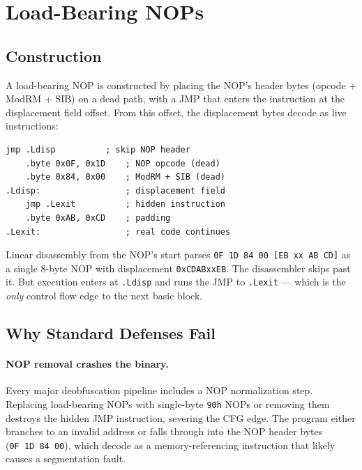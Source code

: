 \documentclass[letterpaper,twocolumn,10pt]{article}
\begin{document}
\section{Load-Bearing NOPs}
\label{sec:technique}

\subsection{Construction}

A load-bearing NOP is constructed by placing the NOP's header bytes (opcode + ModRM + SIB) on a dead path, with a JMP that enters the instruction at the displacement field offset. From this offset, the displacement bytes decode as live instructions:

\begin{lstlisting}[language={[x86masm]Assembler}]
    jmp .Ldisp          ; skip NOP header
    .byte 0x0F, 0x1D    ; NOP opcode (dead)
    .byte 0x84, 0x00    ; ModRM + SIB (dead)
.Ldisp:                 ; displacement field
    jmp .Lexit          ; hidden instruction
    .byte 0xAB, 0xCD    ; padding
.Lexit:                 ; real code continues
\end{lstlisting}

Linear disassembly from the NOP's start parses \texttt{0F~1D~84~00~[EB~xx~AB~CD]} as a single 8-byte NOP with displacement \texttt{0xCDABxxEB}. The disassembler skips past it. But execution enters at \texttt{.Ldisp} and runs the JMP to \texttt{.Lexit} --- which is the \emph{only} control flow edge to the next basic block.

\subsection{Why Standard Defenses Fail}

\paragraph{NOP removal crashes the binary.} Every major deobfuscation pipeline includes a NOP normalization step. Replacing load-bearing NOPs with single-byte \texttt{90h} NOPs or removing them destroys the hidden JMP instruction, severing the CFG edge. The program either branches to an invalid address or falls through into the NOP header bytes (\texttt{0F~1D~84~00}), which decode as a memory-referencing instruction that likely causes a segmentation fault.
\end{document}
